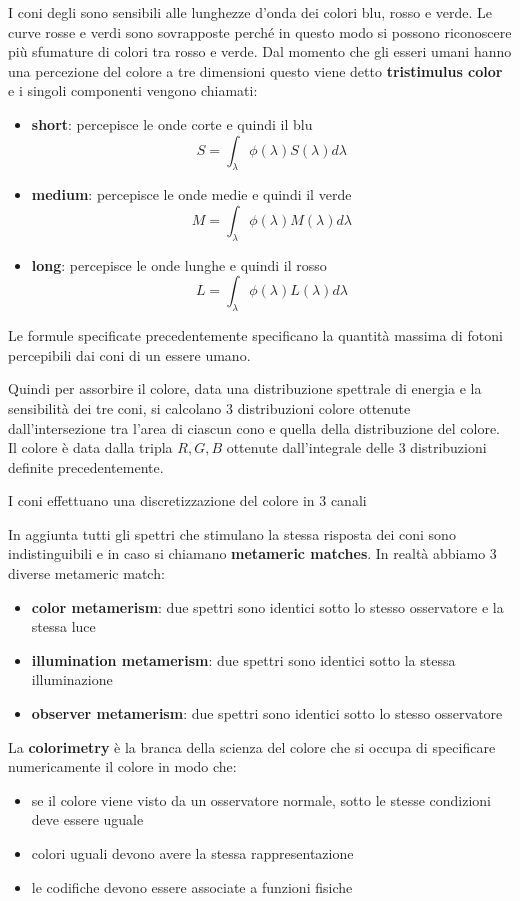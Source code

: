 I coni degli sono sensibili alle lunghezze d'onda dei colori blu, rosso e verde. Le curve 
rosse e verdi sono sovrapposte perché in questo modo si possono riconoscere più 
sfumature di colori tra rosso e verde. Dal momento che gli esseri umani hanno una 
percezione del colore a tre dimensioni questo viene detto \textbf{tristimulus color} 
e i singoli componenti vengono chiamati:
\begin{itemize}
    \item \textbf{short}: percepisce le onde corte e quindi il blu
    $$S = \int_{\lambda} \phi(\lambda) S(\lambda)d\lambda$$
    \item \textbf{medium}: percepisce le onde medie e quindi il verde
    $$M = \int_{\lambda} \phi(\lambda) M(\lambda)d\lambda$$
    \item \textbf{long}: percepisce le onde lunghe e quindi il rosso
    $$L = \int_{\lambda} \phi(\lambda) L(\lambda)d\lambda$$
\end{itemize}

Le formule specificate precedentemente specificano la quantità massima di fotoni
percepibili dai coni di un essere umano.

Quindi per assorbire il colore, data una distribuzione spettrale di energia e 
la sensibilità dei tre coni, si calcolano $3$ distribuzioni colore ottenute dall'intersezione 
tra l'area di ciascun cono e quella della distribuzione del colore. Il colore è 
data dalla tripla $R,G,B$  ottenute dall'integrale delle $3$ distribuzioni definite 
precedentemente. 

\begin{nota}
I coni effettuano una discretizzazione del colore in $3$ canali
\end{nota}

In aggiunta tutti gli spettri che stimulano la stessa risposta dei coni sono indistinguibili 
e in caso si chiamano \textbf{metameric matches}. In realtà abbiamo 3 diverse metameric 
match:
\begin{itemize}
    \item \textbf{color metamerism}: due spettri sono identici sotto lo stesso osservatore 
    e la stessa luce
    \item \textbf{illumination metamerism}: due spettri sono identici sotto la stessa illuminazione
    \item \textbf{observer metamerism}: due spettri sono identici sotto lo stesso osservatore
\end{itemize} 

\begin{definizione}
    La \textbf{colorimetry} è la branca della scienza del colore che si occupa 
    di specificare numericamente il colore in modo che:
    \begin{itemize}
        \item se il colore viene visto da un osservatore normale, sotto le stesse 
        condizioni deve essere uguale
        \item colori uguali devono avere la stessa rappresentazione
        \item le codifiche devono essere associate a funzioni fisiche
    \end{itemize}
\end{definizione}

